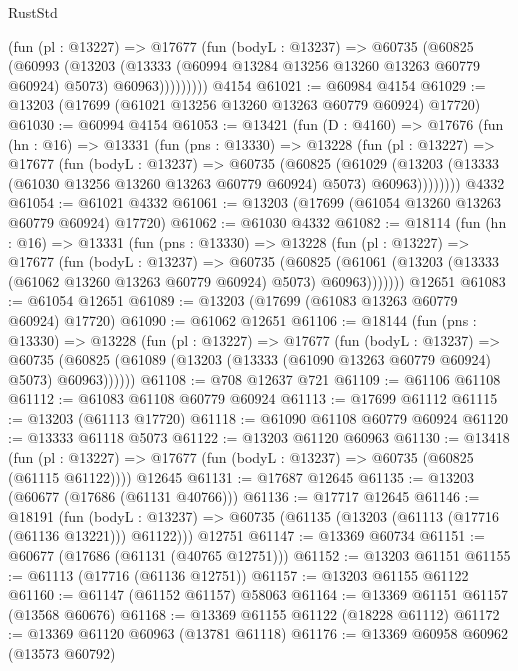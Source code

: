 \begin{lexlean}{RustStd}
\begin{coremodule}
            (fun (pl : @13227) =>
            @17677
              (fun (bodyL : @13237) =>
              @60735
                (@60825
                  (@60993
                    (@13203
                      (@13333 (@60994 @13284 @13256 @13260 @13263 @60779 @60924) @5073)
                      @60963)))))))))
    @4154
@61021 := @60984 @4154
@61029 := @13203 (@17699 (@61021 @13256 @13260 @13263 @60779 @60924) @17720)
@61030 := @60994 @4154
@61053 := @13421
    (fun (D : @4160) =>
    @17676
      (fun (hn : @16) =>
      @13331
        (fun (pns : @13330) =>
        @13228
          (fun (pl : @13227) =>
          @17677
            (fun (bodyL : @13237) =>
            @60735
              (@60825
                (@61029
                  (@13203 (@13333 (@61030 @13256 @13260 @13263 @60779 @60924) @5073) @60963))))))))
    @4332
@61054 := @61021 @4332
@61061 := @13203 (@17699 (@61054 @13260 @13263 @60779 @60924) @17720)
@61062 := @61030 @4332
@61082 := @18114
    (fun (hn : @16) =>
    @13331
      (fun (pns : @13330) =>
      @13228
        (fun (pl : @13227) =>
        @17677
          (fun (bodyL : @13237) =>
          @60735
            (@60825
              (@61061 (@13203 (@13333 (@61062 @13260 @13263 @60779 @60924) @5073) @60963)))))))
    @12651
@61083 := @61054 @12651
@61089 := @13203 (@17699 (@61083 @13263 @60779 @60924) @17720)
@61090 := @61062 @12651
@61106 := @18144
    (fun (pns : @13330) =>
    @13228
      (fun (pl : @13227) =>
      @17677
        (fun (bodyL : @13237) =>
        @60735 (@60825 (@61089 (@13203 (@13333 (@61090 @13263 @60779 @60924) @5073) @60963))))))
@61108 := @708 @12637 @721
@61109 := @61106 @61108
@61112 := @61083 @61108 @60779 @60924
@61113 := @17699 @61112
@61115 := @13203 (@61113 @17720)
@61118 := @61090 @61108 @60779 @60924
@61120 := @13333 @61118 @5073
@61122 := @13203 @61120 @60963
@61130 := @13418
    (fun (pl : @13227) => @17677 (fun (bodyL : @13237) => @60735 (@60825 (@61115 @61122))))
    @12645
@61131 := @17687 @12645
@61135 := @13203 (@60677 (@17686 (@61131 @40766)))
@61136 := @17717 @12645
@61146 := @18191
    (fun (bodyL : @13237) => @60735 (@61135 (@13203 (@61113 (@17716 (@61136 @13221))) @61122)))
    @12751
@61147 := @13369 @60734
@61151 := @60677 (@17686 (@61131 (@40765 @12751)))
@61152 := @13203 @61151
@61155 := @61113 (@17716 (@61136 @12751))
@61157 := @13203 @61155 @61122
@61160 := @61147 (@61152 @61157) @58063
@61164 := @13369 @61151 @61157 (@13568 @60676)
@61168 := @13369 @61155 @61122 (@18228 @61112)
@61172 := @13369 @61120 @60963 (@13781 @61118)
@61176 := @13369 @60958 @60962 (@13573 @60792)

\end{coremodule}
\end{lexlean}
